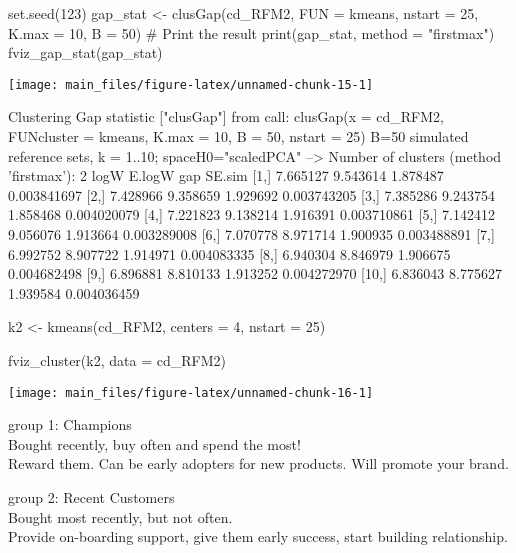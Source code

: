 \begin{Schunk}
\begin{Sinput}
set.seed(123)
gap_stat <- clusGap(cd_RFM2, FUN = kmeans, nstart = 25,
                    K.max = 10, B = 50)
# Print the result
print(gap_stat, method = "firstmax")
fviz_gap_stat(gap_stat)
\end{Sinput}


\begin{center}\texttt{[image: main\_files/figure-latex/unnamed-chunk-15-1]} \end{center}

\begin{Soutput}
Clustering Gap statistic ["clusGap"] from call:
clusGap(x = cd_RFM2, FUNcluster = kmeans, K.max = 10, B = 50,     nstart = 25)
B=50 simulated reference sets, k = 1..10; spaceH0="scaledPCA"
 --> Number of clusters (method 'firstmax'): 2
          logW   E.logW      gap      SE.sim
 [1,] 7.665127 9.543614 1.878487 0.003841697
 [2,] 7.428966 9.358659 1.929692 0.003743205
 [3,] 7.385286 9.243754 1.858468 0.004020079
 [4,] 7.221823 9.138214 1.916391 0.003710861
 [5,] 7.142412 9.056076 1.913664 0.003289008
 [6,] 7.070778 8.971714 1.900935 0.003488891
 [7,] 6.992752 8.907722 1.914971 0.004083335
 [8,] 6.940304 8.846979 1.906675 0.004682498
 [9,] 6.896881 8.810133 1.913252 0.004272970
[10,] 6.836043 8.775627 1.939584 0.004036459
\end{Soutput}
\end{Schunk}

\begin{Schunk}
\begin{Sinput}
k2 <- kmeans(cd_RFM2, centers = 4, nstart = 25)

fviz_cluster(k2, data = cd_RFM2)
\end{Sinput}


\begin{center}\texttt{[image: main\_files/figure-latex/unnamed-chunk-16-1]} \end{center}

\end{Schunk}

group 1: Champions\\
Bought recently, buy often and spend the most!\\
Reward them. Can be early adopters for new products. Will promote your
brand.

group 2: Recent Customers\\
Bought most recently, but not often.\\
Provide on-boarding support, give them early success, start building
relationship.

